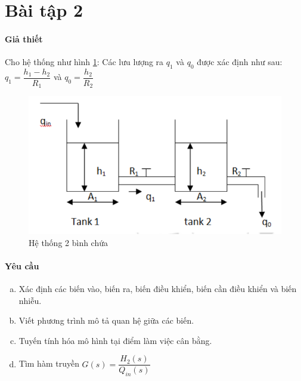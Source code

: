 \documentclass[12pt,a4paper]{article}
\begin{document}
\section{Bài tập 2}
        \paragraph{Giả thiết}
        Cho hệ thống như hình \ref{baitap2}:  Các lưu lượng ra $q_1$ và $q_0$ được xác định như sau: $q_1 = \dfrac{h_1 - h_2}{R_1}$ và $q_0 = \dfrac{h_2}{R_2}$
            \begin{figure}[htp]
                \begin{center}
                    \includegraphics[scale=.5]{bai2}
                \end{center}
                \caption{Hệ thống 2 bình chứa} \label{baitap2}
            \end{figure}

        \paragraph{Yêu cầu}
            \begin{enumerate}[a.]
                \item Xác định các biến vào, biến ra, biến điều khiển, biến cần điều khiển và biến nhiễu.
                \item Viết phương trình mô tả quan hệ giữa các biến.
                \item Tuyến tính hóa mô hình tại điểm làm việc cân bằng.
                \item Tìm hàm truyền $G(s) = \dfrac{H_2(s)}{Q_{in}(s)}$                                    
            \end{enumerate}
\end{document}
